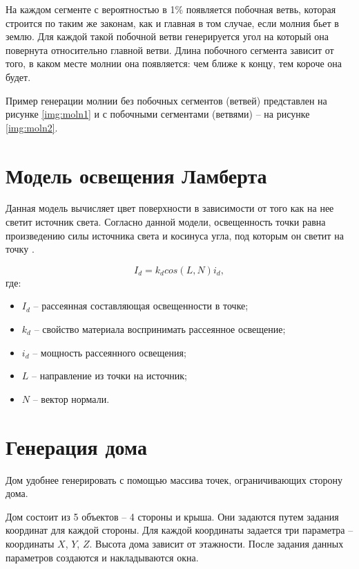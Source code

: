 На каждом сегменте с вероятностью в 1\% появляется побочная ветвь, которая строится по таким же законам, как и главная в том случае, если молния бьет в землю. Для каждой такой побочной ветви генерируется угол на который она повернута относительно главной ветви. Длина побочного сегмента зависит от того, в каком месте молнии она появляется: чем ближе к концу, тем короче она будет. 

Пример генерации молнии без побочных сегментов (ветвей) представлен на рисунке \ref{img:moln1} и с побочными сегментами (ветвями) -- на рисунке \ref{img:moln2}.



\section{Модель освещения Ламберта}

Данная модель вычисляет цвет поверхности в зависимости от того как на нее светит источник света. Согласно данной модели, освещенность точки равна произведению силы источника света и косинуса угла, под которым он светит на точку \cite{lamber_fong}.

\begin{equation}
	\label{eq:lambert}
	I_{d} = k_{d}  cos(L, N)  i_{d},
\end{equation}
где:
\begin{itemize}
	\item $I_{d}$ -- рассеянная составляющая освещенности в точке;
	\item $k_{d}$ -- свойство материала воспринимать рассеянное освещение;
	\item $i_{d}$ -- мощность рассеянного освещения;
	\item $L$ -- направление из точки на источник;
	\item $N$ -- вектор нормали.
\end{itemize}

\section{Генерация дома}
Дом удобнее генерировать с помощью массива точек, ограничивающих сторону дома.

Дом состоит из 5 объектов – 4 стороны и крыша. Они задаются путем задания координат для каждой стороны. Для каждой координаты задается три параметра – координаты $X$, $Y$, $Z$. Высота дома зависит от этажности. После задания данных параметров создаются и накладываются окна. 

